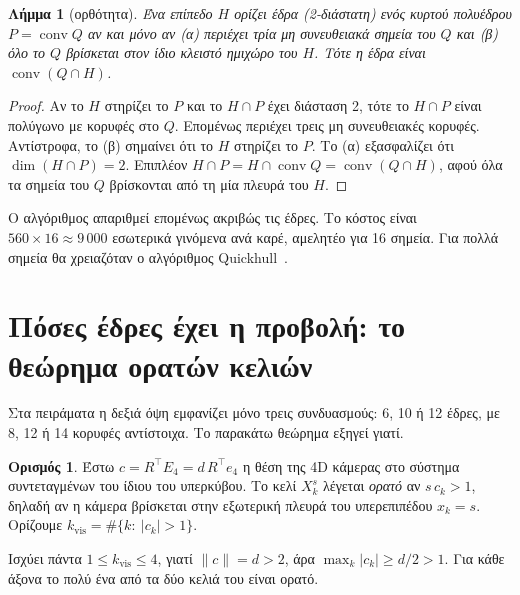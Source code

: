 \documentclass[10pt,a4paper]{article}
\theoremstyle{plain}
\newtheorem{lemma}[theorem]{Λήμμα}
\theoremstyle{definition}
\newtheorem{definition}[theorem]{Ορισμός}
\newcommand{\eng}[1]{\textenglish{#1}}
\DeclareMathOperator{\conv}{conv}
\begin{document}
\begin{lemma}[ορθότητα]
Ένα επίπεδο $H$ ορίζει έδρα (2-διάστατη) ενός κυρτού πολυέδρου $P=\conv Q$ αν και μόνο αν (α) περιέχει τρία μη συνευθειακά σημεία του $Q$ και (β) όλο το $Q$ βρίσκεται στον ίδιο κλειστό ημιχώρο του $H$. Τότε η έδρα είναι $\conv(Q\cap H)$.
\end{lemma}
\begin{proof}
Αν το $H$ στηρίζει το $P$ και το $H\cap P$ έχει διάσταση 2, τότε το $H\cap P$ είναι πολύγωνο με κορυφές στο $Q$. Επομένως περιέχει τρεις μη συνευθειακές κορυφές. Αντίστροφα, το (β) σημαίνει ότι το $H$ στηρίζει το $P$. Το (α) εξασφαλίζει ότι $\dim(H\cap P)=2$. Επιπλέον $H\cap P=H\cap\conv Q=\conv(Q\cap H)$, αφού όλα τα σημεία του $Q$ βρίσκονται από τη μία πλευρά του $H$.
\end{proof}
Ο αλγόριθμος απαριθμεί επομένως ακριβώς τις έδρες. Το κόστος είναι $560\times16\approx9\,000$ εσωτερικά γινόμενα ανά καρέ, αμελητέο για 16 σημεία. Για πολλά σημεία θα χρειαζόταν ο αλγόριθμος \eng{Quickhull}~\cite{quickhull}.

\section{Πόσες έδρες έχει η προβολή: το θεώρημα ορατών κελιών}
Στα πειράματα η δεξιά όψη εμφανίζει μόνο τρεις συνδυασμούς: 6, 10 ή 12 έδρες, με 8, 12 ή 14 κορυφές αντίστοιχα. Το παρακάτω θεώρημα εξηγεί γιατί.

\begin{definition}
Έστω $c=R^{\top}E_4=d\,R^{\top}e_4$ η θέση της 4D κάμερας στο σύστημα συντεταγμένων του ίδιου του υπερκύβου. Το κελί $X_k^s$ λέγεται \emph{ορατό} αν $s\,c_k>1$, δηλαδή αν η κάμερα βρίσκεται στην εξωτερική πλευρά του υπερεπιπέδου $x_k=s$. Ορίζουμε $k_{\mathrm{vis}}=\#\{k:\ |c_k|>1\}$.
\end{definition}
Ισχύει πάντα $1\le k_{\mathrm{vis}}\le4$, γιατί $\|c\|=d>2$, άρα $\max_k|c_k|\ge d/2>1$. Για κάθε άξονα το πολύ ένα από τα δύο κελιά του είναι ορατό.
\end{document}
